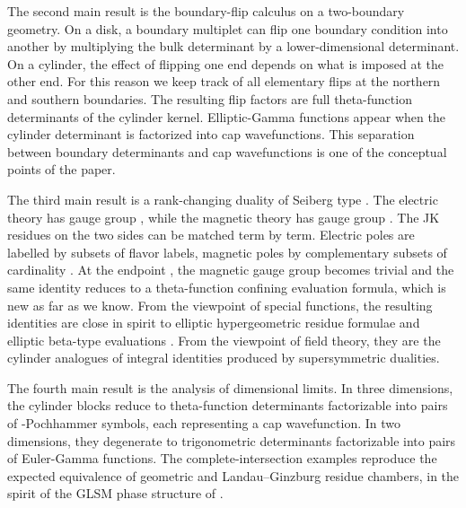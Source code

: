 \documentclass[11pt,a4paper]{article}
\makeatletter
\numberwithin{equation}{section}
\theoremstyle{plain}
\theoremstyle{definition}
\theoremstyle{remark}
\newcounter{mathrecordid}
\newcommand{\mathboxbegin}[1]{%
  \stepcounter{mathrecordid}%
  \immediate\write\mathrecords{\themathrecordid,#1}%
  \special{pdf:bann << /Type /Annot /Subtype /Link /Border [0 0 0]
    /MathBoxID \themathrecordid /F 2
    /A << /S /URI /URI (urn:mathbox:\themathrecordid) >> >>}}
\newcommand{\mathboxinlineplain}[1]{$#1$}
\newcommand{\mathboxinline}[1]{%
  $\mathboxbegin{inline}#1\special{pdf:eann}$}
\newcommand{\recordmath}{%
  \ifmeasuring@\expandafter\mathboxinlineplain
  \else\expandafter\mathboxinline\fi}
\makeatother
\begin{document}
The second main result is the boundary-flip calculus on a two-boundary geometry.  On a disk, a boundary multiplet can flip one boundary condition into another by multiplying the bulk determinant by a lower-dimensional determinant.  On a cylinder, the effect of flipping one end depends on what is imposed at the other end.  For this reason we keep track of all elementary flips at the northern and southern boundaries. The resulting flip factors are full theta-function determinants of the cylinder kernel. Elliptic-Gamma functions appear when the cylinder determinant is factorized into cap wavefunctions.  This separation between boundary determinants and cap wavefunctions is one of the conceptual points of the paper.

The third main result is a rank-changing duality of Seiberg type \cite{Seiberg:1994pq}. The electric theory has gauge group \recordmath{U(N_c)}, while the magnetic theory has gauge group \recordmath{U(N_f-N_c)}. The JK residues on the two sides can be matched term by term. Electric poles are labelled by subsets \recordmath{\mathcal I} of \recordmath{N_c} flavor labels, magnetic poles by complementary subsets \recordmath{\mathcal J=\mathcal I^c} of cardinality \recordmath{N_f-N_c}. At the endpoint \recordmath{N_f=N_c}, the magnetic gauge group becomes trivial and the same identity reduces to a theta-function confining evaluation formula, which is new as far as we know. From the viewpoint of special functions, the resulting identities are close in spirit to elliptic hypergeometric residue formulae and elliptic beta-type evaluations \cite{Spiridonov:2001ig,Rains:2003}.  From the viewpoint of field theory, they are the cylinder analogues of integral  identities produced by supersymmetric dualities.

The fourth main result is the analysis of dimensional limits. In three dimensions, the cylinder blocks reduce to theta-function determinants factorizable into pairs of \recordmath{q}-Pochhammer symbols, each representing a cap wavefunction. In two dimensions, they degenerate to trigonometric determinants factorizable into pairs of Euler-Gamma functions. The complete-intersection examples reproduce the expected equivalence of geometric and Landau--Ginzburg residue chambers, in the spirit of the GLSM phase structure of \cite{Witten:1993yc}.  
\end{document}
